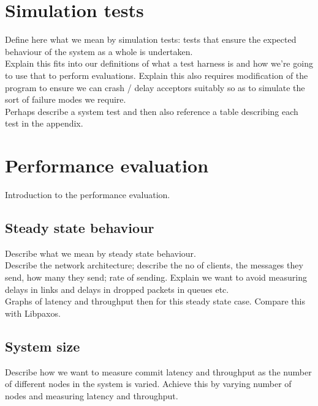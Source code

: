 \section{Simulation tests}

Define here what we mean by simulation tests: tests that ensure the expected behaviour of the system as a whole is undertaken. \\

Explain this fits into our definitions of what a test harness is and how we're going to use that to perform evaluations. Explain this also requires modification of the program to ensure we can crash / delay acceptors suitably so as to simulate the sort of failure modes we require. \\

Perhaps describe a system test and then also reference a table describing each test in the appendix. \\

\section{Performance evaluation}

Introduction to the performance evaluation.

\subsection{Steady state behaviour}

Describe what we mean by steady state behaviour. \\

Describe the network architecture; describe the no of clients, the messages they send, how many they send; rate of sending. Explain we want to avoid measuring delays in links and delays in dropped packets in queues etc. \\

{\color{blue}Graphs of latency and throughput then for this steady state case. Compare this with Libpaxos.}

\subsection{System size}

Describe how we want to measure commit latency and throughput as the number of different nodes in the system is varied. Achieve this by varying number of nodes and measuring latency and throughput. \\

